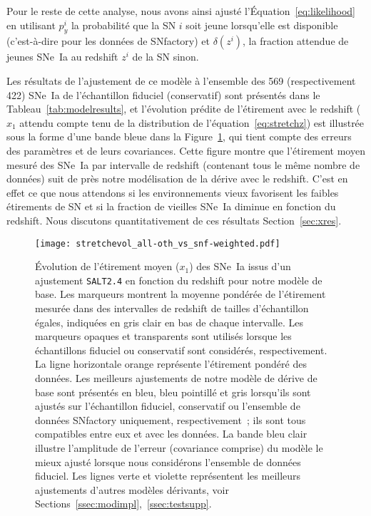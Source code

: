 \documentclass[../main/main.tex]{subfiles}
\begin{document}
Pour le reste de cette analyse, nous avons ainsi ajusté
l'Équation~\ref{eq:likelihood} en utilisant $p_y^i$ la probabilité que la SN $i$
soit jeune lorsqu'elle est disponible (c'est-à-dire pour les données de
SNfactory) et $\delta(z^i)$, la fraction attendue de jeunes SNe~Ia au redshift
$z^i$ de la SN sinon.\bigbreak

Les résultats de l'ajustement de ce modèle à l'ensemble des 569 (respectivement
422) SNe~Ia de l'échantillon fiduciel (conservatif) sont présentés dans le
Tableau~\ref{tab:modelresults}, et l'évolution prédite de l'étirement avec le
redshift ($x_1$ attendu compte tenu de la distribution de
l'équation~\ref{eq:stretchz}) est illustrée sous la forme d'une bande bleue dans
la Figure~\ref{fig:evol_all}, qui tient compte des erreurs des paramètres et de
leurs covariances. Cette figure montre que l'étirement moyen mesuré des SNe~Ia
par intervalle de redshift (contenant tous le même nombre de données) suit de
près notre modélisation de la dérive avec le redshift. C'est en effet ce que
nous attendons si les environnements vieux favorisent les faibles étirements de SN
\citep[voir par exemple][]{howell2007} et si la fraction de vieilles SNe~Ia
diminue en fonction du redshift. Nous discutons quantitativement de ces
résultats Section~\ref{sec:xres}.

\begin{figure}
    \texttt{[image: stretchevol\_all-oth\_vs\_snf-weighted.pdf]}
    \caption[Évolution de l'étirement moyen des SNe~Ia en fonction du redshift
    issu de la prédiction de notre modèle de base selon l'échantillon
    utilisé]{Évolution de l'étirement moyen ($x_1$) des SNe~Ia issus d'un
        ajustement \texttt{SALT2.4} en fonction du redshift pour notre modèle de
        base. Les marqueurs montrent la moyenne pondérée de l'étirement mesurée
        dans des intervalles de redshift de tailles d'échantillon égales,
        indiquées en gris clair en bas de chaque intervalle. Les marqueurs
        opaques et transparents sont utilisés lorsque les échantillons fiduciel
        ou conservatif sont considérés, respectivement. La ligne horizontale
        orange représente l'étirement pondéré des données. Les meilleurs
        ajustements de notre modèle de dérive de base sont présentés en bleu,
        bleu pointillé et gris lorsqu'ils sont ajustés sur l'échantillon
        fiduciel, conservatif ou l'ensemble de données SNfactory uniquement,
        respectivement~; ils sont tous compatibles entre eux et avec les
        données. La bande bleu clair illustre l'amplitude de l'erreur
        (covariance comprise) du modèle le mieux ajusté lorsque nous considérons
        l'ensemble de données fiduciel. Les lignes verte et violette
        représentent les meilleurs ajustements d'autres modèles dérivants, voir
    Sections~\ref{ssec:modimpl},~\ref{ssec:testsupp}.}
    \label{fig:evol_all}
\end{figure}
\end{document}
